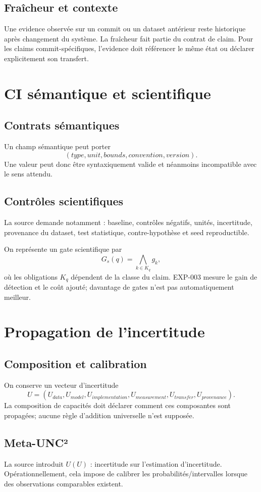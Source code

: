 \section{Fraîcheur et contexte}
Une evidence observée sur un commit ou un dataset antérieur reste historique après changement du système. La fraîcheur fait partie du contrat de claim. Pour les claims commit-spécifiques, l'evidence doit référencer le même état ou déclarer explicitement son transfert.

\chapter{CI sémantique et scientifique}

\section{Contrats sémantiques}
Un champ sémantique peut porter
\[
(type,unit,bounds,convention,version).
\]
Une valeur peut donc être syntaxiquement valide et néanmoins incompatible avec le sens attendu.

\section{Contrôles scientifiques}
La source demande notamment : baseline, contrôles négatifs, unités, incertitude, provenance du dataset, test statistique, contre-hypothèse et seed reproductible.

On représente un gate scientifique par
\[
G_s(q)=\bigwedge_{k\in K_q} g_k,
\]
où les obligations $K_q$ dépendent de la classe du claim. EXP-003 mesure le gain de détection et le coût ajouté; davantage de gates n'est pas automatiquement meilleur.

\chapter{Propagation de l'incertitude}

\section{Composition et calibration}
On conserve un vecteur d'incertitude
\[
U=(U_{data},U_{model},U_{implementation},U_{measurement},U_{transfer},U_{provenance}).
\]
La composition de capacités doit déclarer comment ces composantes sont propagées; aucune règle d'addition universelle n'est supposée.

\section{Meta-UNC²}
La source introduit $U(U)$ : incertitude sur l'estimation d'incertitude. Opérationnellement, cela impose de calibrer les probabilités/intervalles lorsque des observations comparables existent.

